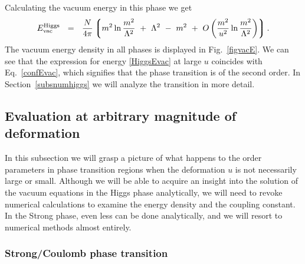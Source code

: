 \documentclass[epsfig,12pt]{article}
\def\beq{\begin{equation}}
\def\eeq{\end{equation}}
\def\beq{\begin{equation}}
\def\eeq{\end{equation}}
\newcommand{\lgr}{\left\lgroup}
\newcommand{\rgr}{\right\rgroup}
\begin{document}
{Calculating the vacuum energy in this phase we get
\beq
E_{\rm vac}^{\rm Higgs} ~~=~~ \frac{N}{4\pi}\lgr m^2\ln {\frac{m^2}{\Lambda^2}} ~+~ \Lambda^2 ~-~ m^2 
                                                         ~+~ O \left( \frac{m^2}{u^2} \ln \frac{m^2}{\Lambda^2} \right)
					\rgr.
\label{HiggsEvac}
\eeq
The vacuum energy density in all phases is displayed in Fig.~\ref{figvacE}. 
We can see that the expression for energy \eqref{HiggsEvac} at large $u$ coincides with Eq.~\eqref{confEvac},
which signifies that the phase transition is of the second order.
In Section~\ref{subsnumhiggs} we will analyze the transition in more detail.

%
%
\subsection{Evaluation at arbitrary magnitude of deformation} 
\label{subsnum}

In this subsection we will grasp a picture of what happens to the order parameters in phase 
transition regions when the deformation $ u $ is not necessarily large or small.
Although we will be able to acquire an insight into the solution of the vacuum equations
in the Higgs phase analytically, we will need to revoke numerical calculations to 
examine the energy density and the coupling constant. 
In the Strong phase, even less can be done analytically, and we will resort to numerical
methods almost entirely. 

\subsubsection{Strong/Coulomb phase transition}

}
\end{document}
